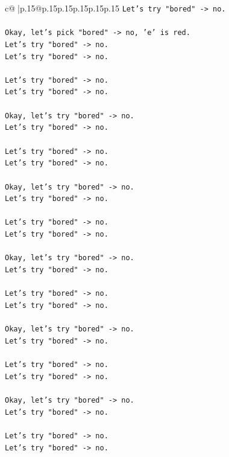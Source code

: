 \documentclass{article}
\begin{document}
{\begin{supertabular}{c@{$\;$}|p{.15\linewidth}@{}p{.15\linewidth}p{.15\linewidth}p{.15\linewidth}p{.15\linewidth}p{.15\linewidth}}
{{{\texttt{Let's try "bored" {-}> no.} \\
\\ 
\texttt{Okay, let's pick "bored" {-}> no, 'e' is red.} \\
\texttt{Let's try "bored" {-}> no.} \\
\texttt{Let's try "bored" {-}> no.} \\
\\ 
\texttt{Let's try "bored" {-}> no.} \\
\texttt{Let's try "bored" {-}> no.} \\
\\ 
\texttt{Okay, let's try "bored" {-}> no.} \\
\texttt{Let's try "bored" {-}> no.} \\
\\ 
\texttt{Let's try "bored" {-}> no.} \\
\texttt{Let's try "bored" {-}> no.} \\
\\ 
\texttt{Okay, let's try "bored" {-}> no.} \\
\texttt{Let's try "bored" {-}> no.} \\
\\ 
\texttt{Let's try "bored" {-}> no.} \\
\texttt{Let's try "bored" {-}> no.} \\
\\ 
\texttt{Okay, let's try "bored" {-}> no.} \\
\texttt{Let's try "bored" {-}> no.} \\
\\ 
\texttt{Let's try "bored" {-}> no.} \\
\texttt{Let's try "bored" {-}> no.} \\
\\ 
\texttt{Okay, let's try "bored" {-}> no.} \\
\texttt{Let's try "bored" {-}> no.} \\
\\ 
\texttt{Let's try "bored" {-}> no.} \\
\texttt{Let's try "bored" {-}> no.} \\
\\ 
\texttt{Okay, let's try "bored" {-}> no.} \\
\texttt{Let's try "bored" {-}> no.} \\
\\ 
\texttt{Let's try "bored" {-}> no.} \\
\texttt{Let's try "bored" {-}> no.} \\
}}}
\end{supertabular}}
\end{document}
